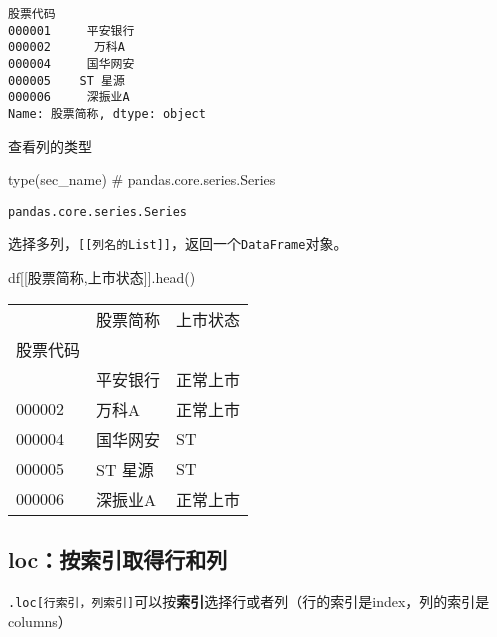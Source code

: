 \documentclass[
  letterpaper,
  DIV=11,
  numbers=noendperiod]{scrreprt}
\newenvironment{Shaded}{\begin{snugshade}}{\end{snugshade}}
\newcommand{\BuiltInTok}[1]{\textcolor[rgb]{0.00,0.23,0.31}{#1}}
\newcommand{\CommentTok}[1]{\textcolor[rgb]{0.37,0.37,0.37}{#1}}
\newcommand{\NormalTok}[1]{\textcolor[rgb]{0.00,0.23,0.31}{#1}}
\newcommand{\StringTok}[1]{\textcolor[rgb]{0.13,0.47,0.30}{#1}}
\begin{document}
\begin{verbatim}
股票代码
000001     平安银行
000002      万科A
000004     国华网安
000005    ST 星源
000006     深振业A
Name: 股票简称, dtype: object
\end{verbatim}

查看列的类型

\begin{Shaded}
\begin{Highlighting}[]
\BuiltInTok{type}\NormalTok{(sec\_name) }\CommentTok{\# pandas.core.series.Series }
\end{Highlighting}
\end{Shaded}

\begin{verbatim}
pandas.core.series.Series
\end{verbatim}

选择多列，\texttt{{[}{[}列名的List{]}{]}}，返回一个\texttt{DataFrame}对象。

\begin{Shaded}
\begin{Highlighting}[]
\NormalTok{df[[}\StringTok{\textquotesingle{}股票简称\textquotesingle{}}\NormalTok{,}\StringTok{\textquotesingle{}上市状态\textquotesingle{}}\NormalTok{]].head()}
\end{Highlighting}
\end{Shaded}

\begin{longtable}[]{@{}lll@{}}
\toprule\noalign{}
& 股票简称 & 上市状态 \\
股票代码 & & \\
\midrule\noalign{}
\endhead
\bottomrule\noalign{}
\endlastfoot
000001 & 平安银行 & 正常上市 \\
000002 & 万科A & 正常上市 \\
000004 & 国华网安 & ST \\
000005 & ST 星源 & ST \\
000006 & 深振业A & 正常上市 \\
\end{longtable}

\hypertarget{locux6309ux7d22ux5f15ux53d6ux5f97ux884cux548cux5217}{%
\subsection{loc：按索引取得行和列}\label{locux6309ux7d22ux5f15ux53d6ux5f97ux884cux548cux5217}}

\texttt{.loc{[}行索引，列索引{]}}可以按\textbf{索引}选择行或者列（行的索引是index，列的索引是columns）
\end{document}
